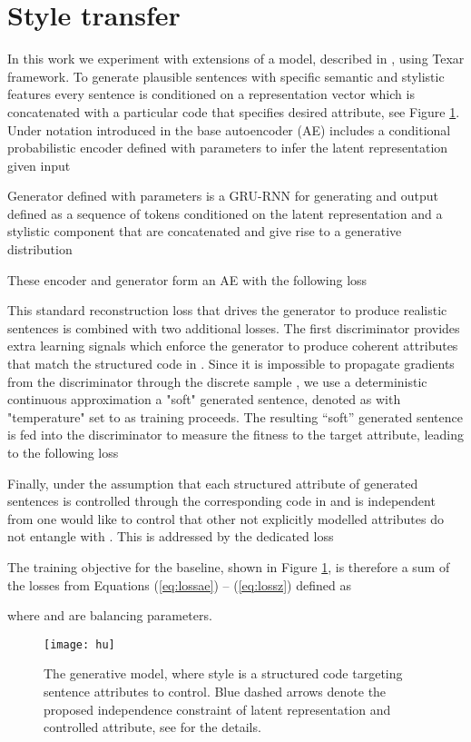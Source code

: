 \documentclass[11pt,a4paper]{article}
\begin{document}
\section{Style transfer}
\label{sec:st}
In this work we experiment with extensions of a model, described in \cite{hylsx}, using Texar \cite{hutexar} framework. To generate plausible sentences with specific semantic and stylistic features every sentence is conditioned on a representation vector  which is concatenated with a particular code  that specifies desired attribute, see Figure \ref{pic:hu}. Under notation introduced in \cite{hylsx} the base autoencoder (AE) includes a conditional probabilistic encoder  defined with parameters  to infer the latent representation  given input 

Generator  defined with parameters   is a GRU-RNN for generating and output  defined as a sequence of tokens  conditioned on the latent representation  and a stylistic component  that are concatenated and give rise to a generative distribution

These encoder and generator form an AE with the following loss


This standard reconstruction loss that drives the generator to produce realistic sentences is combined with two additional losses. The first discriminator provides extra learning signals which enforce the generator to produce coherent attributes that match the structured code in . Since it is impossible to propagate gradients from the discriminator through the discrete sample , we use a deterministic continuous approximation a "soft" generated sentence, denoted as  with "temperature"  set to  as training proceeds. The resulting “soft” generated sentence is fed into the discriminator to measure the fitness to the target attribute, leading to the following loss


Finally, under the assumption that each structured attribute of generated sentences is controlled through the corresponding code in  and is independent from  one would like to control that other not explicitly modelled attributes do not entangle with  . This is addressed by the  dedicated loss

The training objective for the baseline, shown in Figure \ref{pic:hu}, is therefore a sum of the losses from Equations (\ref{eq:lossae}) -- (\ref{eq:lossz}) defined as

where  and  are balancing parameters.

\begin{figure}[ht]
\begin{center}
\centerline{\texttt{[image: hu]}}
\caption{The generative model, where style is a structured code targeting sentence attributes to control.
Blue dashed arrows denote the proposed independence constraint of latent representation and controlled attribute, see \cite{hylsx} for the details.}
\label{pic:hu}
\end{center}
\end{figure}
\end{document}
